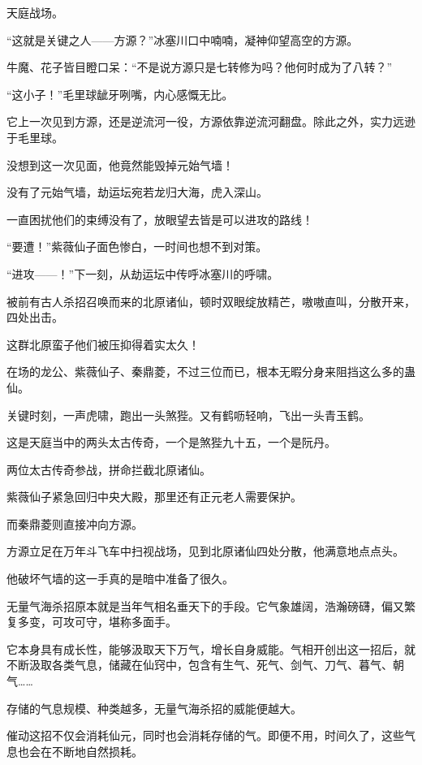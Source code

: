 
\begin{this_body}

天庭战场。

“这就是关键之人——方源？”冰塞川口中喃喃，凝神仰望高空的方源。

牛魔、花子皆目瞪口呆：“不是说方源只是七转修为吗？他何时成为了八转？”

“这小子！”毛里球龇牙咧嘴，内心感慨无比。

它上一次见到方源，还是逆流河一役，方源依靠逆流河翻盘。除此之外，实力远逊于毛里球。

没想到这一次见面，他竟然能毁掉元始气墙！

没有了元始气墙，劫运坛宛若龙归大海，虎入深山。

一直困扰他们的束缚没有了，放眼望去皆是可以进攻的路线！

“要遭！”紫薇仙子面色惨白，一时间也想不到对策。

“进攻——！”下一刻，从劫运坛中传呼冰塞川的呼啸。

被前有古人杀招召唤而来的北原诸仙，顿时双眼绽放精芒，嗷嗷直叫，分散开来，四处出击。

这群北原蛮子他们被压抑得着实太久！

在场的龙公、紫薇仙子、秦鼎菱，不过三位而已，根本无暇分身来阻挡这么多的蛊仙。

关键时刻，一声虎啸，跑出一头煞狴。又有鹤呖轻响，飞出一头青玉鹤。

这是天庭当中的两头太古传奇，一个是煞狴九十五，一个是阮丹。

两位太古传奇参战，拼命拦截北原诸仙。

紫薇仙子紧急回归中央大殿，那里还有正元老人需要保护。

而秦鼎菱则直接冲向方源。

方源立足在万年斗飞车中扫视战场，见到北原诸仙四处分散，他满意地点点头。

他破坏气墙的这一手真的是暗中准备了很久。

无量气海杀招原本就是当年气相名垂天下的手段。它气象雄阔，浩瀚磅礴，偏又繁复多变，可攻可守，堪称多面手。

它本身具有成长性，能够汲取天下万气，增长自身威能。气相开创出这一招后，就不断汲取各类气息，储藏在仙窍中，包含有生气、死气、剑气、刀气、暮气、朝气……

存储的气息规模、种类越多，无量气海杀招的威能便越大。

催动这招不仅会消耗仙元，同时也会消耗存储的气。即便不用，时间久了，这些气息也会在不断地自然损耗。


\end{this_body}
